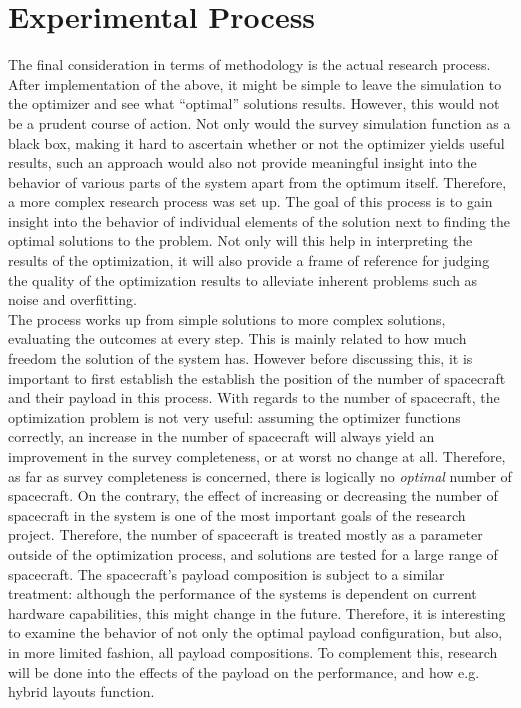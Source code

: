 \section{Experimental Process}
\label{sec:methodologyprocess}
The final consideration in terms of methodology is the actual research process. After implementation of the above, it might be simple to leave the simulation to the optimizer and see what ``optimal'' solutions results. However, this would not be a prudent course of action. Not only would the survey simulation function as a black box, making it hard to ascertain whether or not the optimizer yields useful results, such an approach would also not provide meaningful insight into the behavior of various parts of the system apart from the optimum itself. Therefore, a more complex research process was set up. The goal of this process is to gain insight into the behavior of individual elements of the solution next to finding the optimal solutions to the problem. Not only will this help in interpreting the results of the optimization, it will also provide a frame of reference for judging the quality of the optimization results to alleviate inherent problems such as noise and overfitting.\\

The process works up from simple solutions to more complex solutions, evaluating the outcomes at every step. This is mainly related to how much freedom the solution of the system has. However before discussing this, it is important to first establish the establish the position of the number of spacecraft and their payload in this process. With regards to the number of spacecraft, the optimization problem is not very useful: assuming the optimizer functions correctly, an increase in the number of spacecraft will always yield an improvement in the survey completeness, or at worst no change at all. Therefore, as far as survey completeness is concerned, there is logically no \textit{optimal} number of spacecraft. On the contrary, the effect of increasing or decreasing the number of spacecraft in the system is one of the most important goals of the research project. Therefore, the number of spacecraft is treated mostly as a parameter outside of the optimization process, and solutions are tested for a large range of spacecraft. The spacecraft's payload composition is subject to a similar treatment: although the performance of the systems is dependent on current hardware capabilities, this might change in the future. Therefore, it is interesting to examine the behavior of not only the optimal payload configuration, but also, in more limited fashion, all payload compositions. To complement this, research will be done into the effects of the payload on the performance, and how e.g. hybrid layouts function.\\


